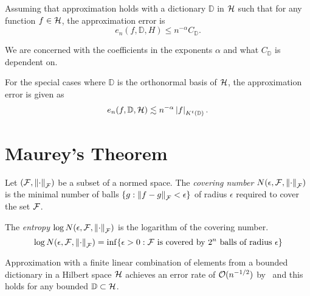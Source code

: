 Assuming that approximation holds with a dictionary $\mathbb{D}$ in $\mathcal{H}$
such that for any function $f \in \mathcal{H}$, the approximation error is
\begin{equation}
    \label{eq:appro_error_general}
    e_n(f, \mathbb{D}, H) \leq n^{-\alpha} C_{\mathbb{D}}.
\end{equation}

We are concerned with the coefficients in the exponents $\alpha$ and what
$C_{\mathbb{D}}$ is dependent on.

For the special cases where $\mathbb{D}$ is the orthonormal basis of $\mathcal{H}$,
the approximation error is given as
\begin{equation}
    \label{eq:appro_error_ortho}
    e_n(f, \mathbb{D}, \mathcal{H}) 
        \lesssim n^{-\alpha} \left| f \right|_{K^t(\mathbb{D})}.
\end{equation}

\section{Maurey's Theorem}

\begin{definition}
    \label{def:covering_num}
    Let $(\mathcal{F}, \left\| \cdot \right\|_{\mathcal{F}})$ be a subset of a normed space. The
    \textit{covering number} $N(\epsilon, \mathcal{F}, \left\| \cdot \right\|_{\mathcal{F}})$ is
    the minimal number of balls $\{g: \left\| f - g \right\|_{\mathcal{F}} < \epsilon\}$ of
    radius $\epsilon$ required to cover the set $\mathcal{F}$. 
\end{definition}

\begin{definition}[Entropy]
    \label{def:entropy} The \textit{entropy} $\log N(\epsilon, \mathcal{F},
    \left\| \cdot \right\|_{\mathcal{F}})$ is the logarithm of the covering number.
    \begin{equation}
        \log N(\epsilon, \mathcal{F}, \left\| \cdot \right\|_{\mathcal{F}})
        = \inf \{
            \epsilon > 0: \mathcal{F} \text{ is covered by } 2^n 
            \text{ balls of radius } \epsilon
        \}
    \end{equation}
\end{definition}

Approximation with a finite linear combination of elements from a bounded
dictionary in a Hilbert space $\mathcal{H}$ achieves an error rate of
$\mathcal{O}(n^{-1/2})$ by~\cite{pisierRemarquesResultatNon1980} and this holds for
any bounded $\mathbb{D} \subset \mathcal{H}$.

